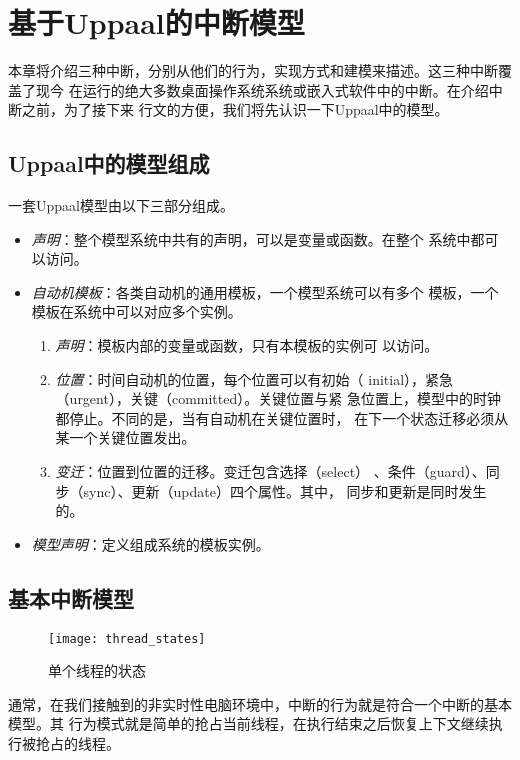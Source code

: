 
\chapter{基于Uppaal的中断模型}
\label{cha:intr}

本章将介绍三种中断，分别从他们的行为，实现方式和建模来描述。这三种中断覆盖了现今
在运行的绝大多数桌面操作系统系统或嵌入式软件中的中断。在介绍中断之前，为了接下来
行文的方便，我们将先认识一下Uppaal中的模型。

\section{Uppaal中的模型组成}
\label{sec:model_combine}	
一套Uppaal模型由以下三部分组成。
\begin{itemize}
	\item \emph{声明}：整个模型系统中共有的声明，可以是变量或函数。在整个
	系统中都可以访问。
	\item \emph{自动机模板}：各类自动机的通用模板，一个模型系统可以有多个
	模板，一个模板在系统中可以对应多个实例。
		\begin{enumerate}[(1)]
			\item \emph{声明}：模板内部的变量或函数，只有本模板的实例可
			以访问。
			\item \emph{位置}：时间自动机的位置，每个位置可以有初始（
			initial），紧急（urgent），关键（committed）。关键位置与紧
			急位置上，模型中的时钟都停止。不同的是，当有自动机在关键位置时，
			在下一个状态迁移必须从某一个关键位置发出。
			\item \emph{变迁}：位置到位置的迁移。变迁包含选择（select）
			、条件（guard）、同步（sync）、更新（update）四个属性。其中，
			同步和更新是同时发生的。
		\end{enumerate}	
	\item \emph{模型声明}：定义组成系统的模板实例。
\end{itemize}

\section{基本中断模型}
\label{sec:basic}

\begin{figure}[H]
	\centering
	\texttt{[image: thread\_states]}
	\caption{单个线程的状态}
	\label{fig:thread_state}
\end{figure}

通常，在我们接触到的非实时性电脑环境中，中断的行为就是符合一个中断的基本模型。其
行为模式就是简单的抢占当前线程，在执行结束之后恢复上下文继续执行被抢占的线程。

